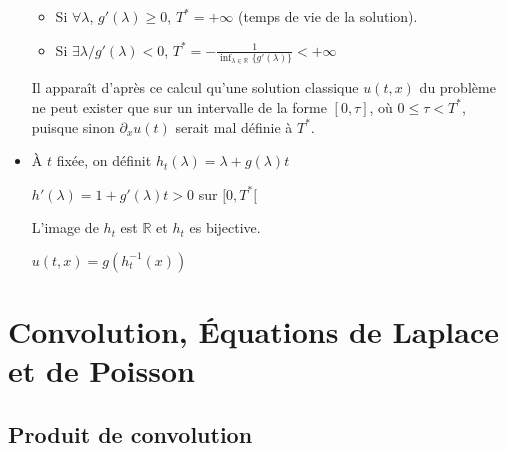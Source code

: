 \documentclass[10pt,a4paper,oneside]{article}
\begin{document}
\begin{itemize}
\begin{itemize}
\item
Si $\forall \lambda$, $g'(\lambda) \geq 0$, $T^{*} = +\infty$ (temps de vie de la solution).

\item
Si $\exists \lambda / g'(\lambda) < 0$, $T^{*} = -\frac{1}{\inf_{\lambda \in \mathbb{R}}\{ g'(\lambda)\} }  < +\infty$
\end{itemize}

Il apparaît d'après ce calcul qu'une solution classique $u(t,x)$ du problème ne peut exister que sur un intervalle de la forme $[0,\tau]$, où $0 \leq \tau < T^{*}$, puisque sinon $\partial_x u(t)$ serait mal définie à $T^{*}$.

\item
À $t$ fixée, on définit $h_t(\lambda) = \lambda + g(\lambda)t$

$h'(\lambda) = 1 + g'(\lambda)t > 0$ sur $[0,T^{*}[$

L'image de $h_t$ est $\mathbb{R}$ et $h_t$ es bijective.

$u(t,x) = g(h^{-1}_t(x))$

\end{itemize}


\section{Convolution, Équations de Laplace et de Poisson}

\subsection{Produit de convolution}
\end{document}
